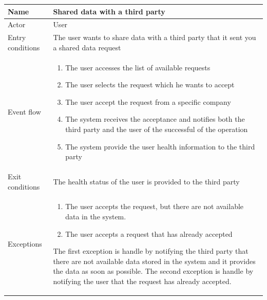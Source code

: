 \begin{table}[H]
\begin{tabularx}{\textwidth}{|l|X|}
\hline
 Name & Shared data with a third party\\ \hline
 Actor & User \\ \hline
 Entry conditions & The user wants to share data with a third party that it sent you a shared data request \\ \hline
 Event flow & 
 \begin{enumerate}
 	\item The user accesses the list of available requests
  	\item The user selects the request which he wants to accept
 	\item The user accept the request from a specific company
 	\item The system receives the acceptance and notifies both the third party and the user of the successful of the operation
 	\item The system provide the user health information to the third party
 \end{enumerate}   \\ \hline
 Exit conditions & The health status of the user is provided to the third party \\ \hline
 Exceptions &  
 \begin{enumerate}
 	\item The user accepts the request, but there are not available data in the system.
	\item The user accepts a request that has already accepted 
 \end{enumerate}
 The first exception is handle by notifying the third party that there are not available data stored in the system and it provides the data as soon as possible.
 The second exception is handle by notifying the user that the request has already accepted.
 \\ \hline
\end{tabularx}
\end{table}


